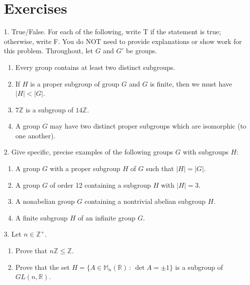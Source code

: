 \documentclass[10pt,]{book}
\theoremstyle{plain}
\theoremstyle{definition}
\theoremstyle{definition}
\theoremstyle{definition}
\theoremstyle{definition}
\numberwithin{equation}{section}
\def\Z{\mathbb{Z}}
\def\R{\mathbb{R}}
\def\M{\mathbb{M}}
\newcommand{\lt}{<}
\begin{document}
\section[{Exercises}]{Exercises}\label{exercises-6}
\begin{exerciselist}
\item[1.]\hypertarget{exercise-35}{}True/False. For each of the following, write T if the statement is true; otherwise, write F. You do NOT need to provide explanations or show work for this problem. Throughout, let \(G\) and \(G'\) be groups. \leavevmode%
\begin{enumerate}[label=(\alph*)]
\item\hypertarget{li-278}{}Every group contains at least two distinct subgroups.%
\item\hypertarget{li-279}{}If \(H\) is a proper subgroup of group \(G\) and \(G\) is finite, then we must have \(|H|\lt |G|\).%
\item\hypertarget{li-280}{}\(7\Z\) is a subgroup of \(14\Z\).%
\item\hypertarget{li-281}{}A group \(G\) may have two distinct proper subgroups which are isomorphic (to one another).%
\end{enumerate}
%
\par\smallskip
\item[2.]\hypertarget{exercise-36}{}Give specific, precise examples of the following groups \(G\) with subgroups \(H\): \leavevmode%
\begin{enumerate}[label=(\alph*)]
\item\hypertarget{li-286}{}A group \(G\) with a proper subgroup \(H\) of \(G\) such that \(|H|=|G|\).%
\item\hypertarget{li-287}{}A group \(G\) of order 12 containing a subgroup \(H\) with \(|H|=3\).%
\item\hypertarget{li-288}{}A nonabelian group \(G\) containing a nontrivial abelian subgroup \(H\).%
\item\hypertarget{li-289}{}A finite subgroup \(H\) of an infinite group \(G\).%
\end{enumerate}
%
\par\smallskip
\item[3.]\hypertarget{exercise-37}{}Let \(n\in \Z^+\). \leavevmode%
\begin{enumerate}[label=(\alph*)]
\item\hypertarget{li-294}{}Prove that \(n\Z \leq \Z\).%
\item\hypertarget{li-295}{}Prove that the set \(H=\{A\in \M_n(\R)\,:\,\det A=\pm 1\}\) is a subgroup of \(GL(n,\R)\).%

\end{enumerate}
\end{exerciselist}
\end{document}

